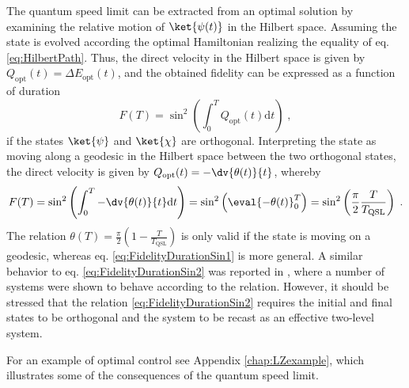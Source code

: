 The quantum speed limit can be extracted from an optimal solution by examining the relative motion of $\ket{\psi (t)}$ in the Hilbert space. Assuming the state is evolved according the optimal Hamiltonian realizing the equality of eq. \eqref{eq:HilbertPath}. Thus, the direct velocity in the Hilbert space is given by $Q_{\mathrm{opt}} (t) = \Delta E_{\mathrm{opt}}(t)$, and the obtained fidelity can be expressed as a function of duration \cite{beyondQSL}
\begin{equation}
	F(T) = \sin ^2 \left( \int_{0}^{T} Q_{\mathrm{opt}} (t) \mathrm{d} t \right) \; ,
	\label{eq:FidelityDurationSin1}
\end{equation}  
if the states $\ket{\psi}$ and $\ket{\chi}$ are orthogonal. Interpreting the state as moving along a geodesic in the Hilbert space between the two orthogonal states, the direct velocity is given by $Q_{\mathrm{opt}} (t) =  -\dv{\theta (t)}{t}$, whereby
\begin{equation}
	F(T) = \sin ^2 \left( \int_{0}^{T} - \dv{\theta (t)}{t} \mathrm{d} t \right) =  \sin ^2 \left( \eval{ - \theta(t)}_{0}^{T} \right) = \sin ^2 \left( \frac{\pi}{2} \frac{T}{T_{\mathrm{QSL}}} \right) \; .
	\label{eq:FidelityDurationSin2}
\end{equation}  
The relation $\theta (T) = \frac{\pi}{2} \left( 1 -  \frac{T}{T_{\mathrm{QSL}}} \right)$ is only valid if the state is moving on a geodesic, whereas eq. \eqref{eq:FidelityDurationSin1} is more general. A similar behavior to eq. \eqref{eq:FidelityDurationSin2} was reported in \cite{Caneva2011}, where a number of systems were shown to behave according to the relation. However, it should be stressed that the relation \eqref{eq:FidelityDurationSin2} requires the initial and final states to be orthogonal and the system to be recast as an effective two-level system.

For an example of optimal control see Appendix \ref{chap:LZexample}, which illustrates some of the consequences of the quantum speed limit.
